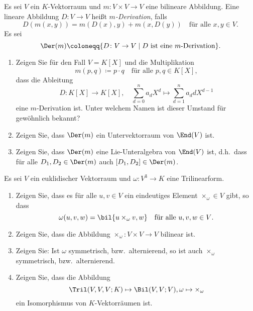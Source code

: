

\begin{question}
  Es sei $V$ ein $K$-Vektorraum und $m \colon V \times V \to V$ eine bilineare Abbildung.
  Eine lineare Abbildung $D \colon V \to V$ heißt \emph{$m$-Derivation}, falls
  \[
    D(m(x,y))
    = m(D(x), y) + m(x, D(y))
    \quad
    \text{für alle $x, y \in V$}.
  \]
  Es sei
  \[
              \Der(m)
    \coloneqq \{ D \colon V \to V \mid \text{$D$ ist eine $m$-Derivation} \}.
  \]
  \begin{enumerate}[leftmargin=*]
    \item
      Zeigen Sie für den Fall $V = K[X]$ und die Multiplikation
      \[
        m(p,q) \coloneqq p \cdot q
        \quad
        \text{für alle $p, q \in K[X]$},
      \]
      dass die Ableitung
      \[
        D \colon K[X] \to K[X],
        \quad
        \sum_{d=0}^n a_d X^d  \mapsto \sum_{d=1}^n a_d d X^{d-1} 
      \]
      eine $m$-Derivation ist.
      Unter welchem Namen ist dieser Umstand für gewöhnlich bekannt?
    \item
      Zeigen Sie, dass $\Der(m)$ ein Untervektorraum von $\End(V)$ ist.
    \item
      Zeigen Sie, dass $\Der(m)$ eine Lie-Unteralgebra von $\End(V)$ ist, d.h.\ dass für alle $D_1, D_2 \in \Der(m)$ auch $[D_1, D_2] \in \Der(m)$.
  \end{enumerate}
\end{question}


\begin{question}
  Es sei $V$ ein euklidischer Vektorraum und $\omega \colon V^3 \to K$ eine Trilinearform.
  \begin{enumerate}[leftmargin=*]
    \item
      Zeigen Sie, dass es für alle $u, v \in V$ ein eindeutiges Element $\times_\omega \in V$ gibt, so dass
      \[
          \omega(u, v, w)
        = \bil{u \times_\omega v, w}
        \quad
        \text{für alle $u, v, w \in V$}.
      \]
    \item
      Zeigen Sie, dass die Abbildung $\times_\omega \colon V \times V \to V$ bilinear ist.
    \item
      Zeigen Sie:
      Ist $\omega$ symmetrisch, bzw.\ alternierend, so ist auch $\times_\omega$ symmetrisch, bzw.\ alternierend.
    \item
      Zeigen Sie, dass die Abbildung
      \[
        \Tril(V, V, V; K) \mapsto \Bil(V, V; V),
        \omega
        \mapsto
        \times_\omega
      \]
      ein Isomorphismus von $K$-Vektorräumen ist.
  \end{enumerate} 
\end{question}


